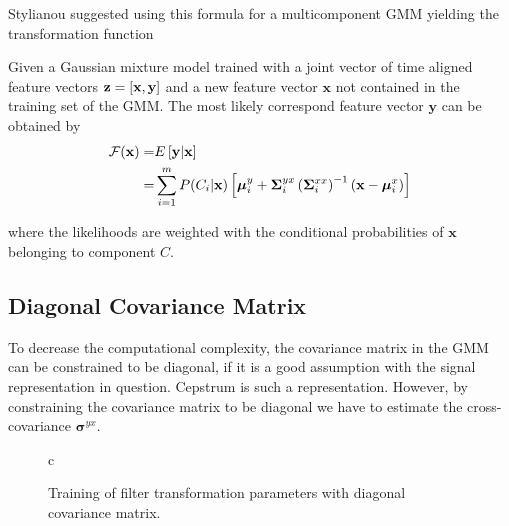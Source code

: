 Stylianou \etal \cite{stylianou95} suggested using this formula for a multicomponent GMM yielding the transformation function
\begin{definition}
	Given a Gaussian mixture model trained with a joint vector of time aligned feature vectors $\mathbf{z} = \left[\mathbf{x},\mathbf{y}\right]$ and a new feature vector $\mathbf{x}$ not contained in the training set of the GMM. The most likely correspond feature vector $\mathbf{y}$ can be obtained by
	\begin{equation}
		\label{eq:transformation_function}
		\begin{split}
			\mathcal F(\mathbf{x}) =& E \left[\mathbf{y}\vert \mathbf{x}\right]\\
			=& \sum_{i=1}^{m}P(C_i \vert \mathbf{x})\left[ \boldsymbol{\mu}_i^y + \mathbf{\Sigma}_i^{yx} \left(\mathbf{\Sigma}_i^{xx}\right)^{-1} (\mathbf{x}-\boldsymbol{\mu}_i^x)\right]
		\end{split}
	\end{equation}
\end{definition}

where the likelihoods are weighted with the conditional probabilities of $\mathbf{x}$ belonging to component $C$. 

\subsection{Diagonal Covariance Matrix} %
\label{sub:diagonal_covariance_matrix}
To decrease the computational complexity, the covariance matrix in the GMM can be constrained to be diagonal, if it is a good assumption with the signal representation in question. Cepstrum is such a representation. However, by constraining the covariance matrix to be diagonal we have to estimate the cross-covariance $\mathbf{\sigma}^{yx}$.

\begin{figure}[htbp]
	\centering
	\begin{tabular}[h]{c}
	\end{tabular}
	\caption{Training of filter transformation parameters with diagonal covariance matrix.}
	\label{fig:VC_training_diag}
\end{figure}

